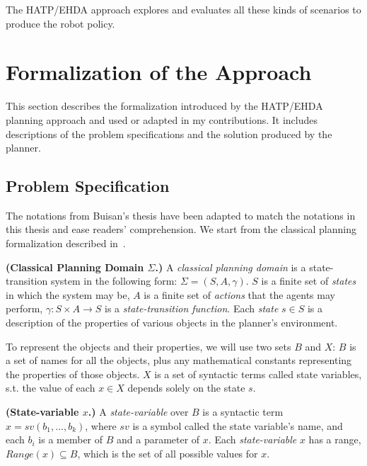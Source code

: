 The HATP/EHDA approach explores and evaluates all these kinds of scenarios to produce the robot policy.


\section{Formalization of the Approach}

This section describes the formalization introduced by the HATP/EHDA planning approach and used or adapted in my contributions. It includes descriptions of the problem specifications and the solution produced by the planner.  

\subsection*{Problem Specification}
\label{sec:problem_spec}

The notations from Buisan's thesis have been adapted to match the notations in this thesis and ease readers' comprehension. We start from the classical planning formalization described in~\cite{ghallab2016automated}.

\begin{definition}
    \textbf{(Classical Planning Domain $\Sigma$.)} A \emph{classical planning domain} is a state-transition system in the following form: $\Sigma = (S, A,\gamma)$. $S$ is a finite set of \emph{states} in which the system may be, $A$ is a finite set of \emph{actions} that the agents may perform, $\gamma: S \times A \rightarrow S$ is a \emph{state-transition function}. Each \emph{state} $s \in S$ is a description of the properties of various objects in the planner's environment. 
    \label{def:classical_planning_domain}
\end{definition}

To represent the objects and their properties, we will use two sets $B$ and $X$: $B$ is a set of names for all the objects, plus any mathematical constants representing the properties of those objects. $X$ is a set of syntactic terms called state variables, s.t. the value of each $x \in X$ depends solely on the state $s$.

\begin{definition}
    \textbf{(State-variable $x$.)} A \emph{state-variable} over $B$ is a syntactic term $x = sv(b_1, ..., b_k)$, where $sv$ is a symbol called the state variable's name, and each $b_i$ is a member of $B$ and a parameter of $x$. Each \emph{state-variable} $x$ has a range, $\textit{Range}(x) \subseteq B$, which is the set of all possible values for $x$.
    \label{def:state_variable}
\end{definition}



